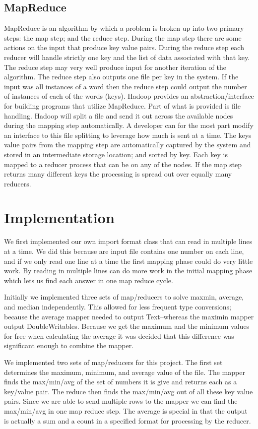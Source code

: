 \documentclass[11pt]{article}
\begin{document}
\subsection*{MapReduce}
MapReduce is an algorithm by which a problem is broken up into two primary steps: the map step; and the reduce step.  During the map step there are some actions on the input that produce key value pairs.  During the reduce step each reducer will handle strictly one key and the list of data associated with that key.  The reduce step may very well produce input for another iteration of the algorithm.  The reduce step also outputs one file per key in the system.  If the input was all instances of a word then the reduce step could output the number of instances of each of the words (keys).  Hadoop provides an abstraction/interface for building programs that utilize MapReduce.  Part of what is provided is file handling.  Hadoop will split a file and send it out across the available nodes during the mapping step automatically.  A developer can for the most part modify an interface to this file splitting to leverage how much is sent at a time.  The keys value pairs from the mapping step are automatically captured by the system and stored in an intermediate storage location; and sorted by key.  Each key is mapped to a reducer process that can be on any of the nodes.  If the map step returns many different keys the processing is spread out over equally many reducers.

\section{Implementation}
We first implemented our own import format class that can read in multiple lines at a time.  We did this because are input file contains one number on each line, and if we only read one line at a time the first mapping phase could do very little work.  By reading in multiple lines can do more work in the initial mapping phase which lets us find each answer in one map reduce cycle.

Initially we implemented three sets of map/reducers to solve maxmin, average, and median independently.  This allowed for less frequent type conversions; because the  average mapper needed to output Text--whereas the maximin mapper output DoubleWritables.  Because we get the maximum and the minimum values for free when calculating the average it was decided that this difference was significant enough to combine the mapper.

We implemented two sets of map/reducers for this project.  The first set determines the maximum, minimum,  and average value of the file.  The mapper finds the max/min/avg of the set of numbers it is give and returns each as a key/value pair.  The reduce then finds the max/min/avg out of all these key value pairs.  Since we are able to send multiple rows to the mapper we can find the max/min/avg in one map reduce step.  The average is special in that the output is actually a sum and a count in a specified format for processing by the reducer.
\end{document}
